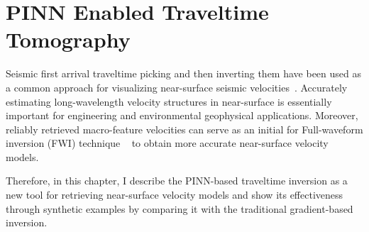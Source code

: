 \chapter{PINN Enabled Traveltime Tomography}
\label{chap:pinn_traveltime}

Seismic first arrival traveltime picking and then inverting them have been used as a common approach for visualizing near-surface seismic velocities~\cite{zsa:92,zt:98,tncc:09}.  Accurately estimating long-wavelength velocity structures in near-surface is essentially important for engineering and environmental geophysical applications. Moreover, reliably retrieved macro-feature velocities can serve as an initial for Full-waveform inversion (FWI) technique ~\cite{t:84,so:85,bszc:95,p:99,roivhd:04,vo:09} to obtain more accurate near-surface velocity models.


Therefore, in this chapter, I describe the PINN-based traveltime inversion as a new tool for retrieving near-surface velocity models and show its effectiveness through synthetic examples by comparing it with the traditional gradient-based inversion.